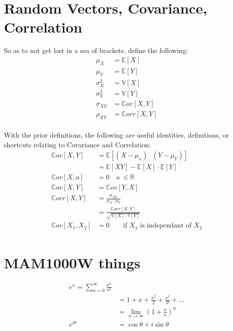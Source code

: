 \section{Random Vectors, Covariance, Correlation}
So as to not get lost in a sea of brackets, define the following:
\begin{equation*}
    \begin{aligned}
        \mu_X &= \mathbb{E}[X] \\
        \mu_Y &= \mathbb{E}[Y] \\
        \sigma_X^2 &= \mathbb{V}[X] \\
        \sigma_Y^2 &= \mathbb{V}[Y] \\
        \sigma_{XY} &= \mathbb{C}ov[X, Y]  \\
        \rho_{XY} &= \mathbb{C}orr[X, Y]  \\
    \end{aligned}
\end{equation*}

With the prior definitions, the following are useful identities, definitions,
or shortcuts relating to Covariance and Correlation:
\begin{equation*}
    \begin{aligned}
        \mathbb{C}ov[X, Y] &= \mathbb{E}[(X - \mu_x)\cdot(Y - \mu_Y)] \\
                  &= \mathbb{E}[XY] - \mathbb{E}[X] \cdot \mathbb{E}[Y] \\
        \mathbb{C}ov[X, a] &= 0 \quad \text{a } \in \mathbb{R} \\
        \mathbb{C}ov[X, Y] &= \mathbb{C}ov[Y, X] \\
        \mathbb{C}orr[X, Y] &= \frac{\sigma_{XY}}{\sigma_X \cdot \sigma_Y}\\
            &= \frac{ \mathbb{C}orr[X, Y] }{ \sqrt{ \mathbb{V}[X] \cdot \mathbb{V}[Y] }} \\
        \mathbb{C}ov[X_1, X_2] &= 0 \qquad \text{if $X_1$ is independant of
        $X_2$}\\
    \end{aligned}
\end{equation*}
    

\section{MAM1000W things}
\begin{equation*}
    \begin{aligned}
        e^x = \sum_{n=0}^{\infty} \frac{x^n}{n!}  \\
            &= 1 + x + \frac{x^2}{2} + \frac{x^3}{3!} + \dots \\
            &= \lim_{n\to\infty} \left(1 + \frac{x}{n} \right)^n \\
        e^{i\theta} &= \cos\theta + i\sin\theta \\
    \end{aligned}
\end{equation*}

